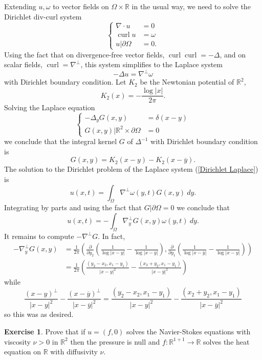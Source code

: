 \documentclass[10pt]{article}
\newcommand{\RR}{\mathbb{R}}
\DeclareMathOperator{\curl}{curl}
\theoremstyle{definition}
\newtheorem{exer}{Exercise}
\begin{document}
Extending $u, \omega$ to vector fields on $\Omega \times \RR$ in the usual way, we need to solve the Dirichlet div-curl system
$$\begin{cases}
\nabla \cdot u &= 0\\
\curl u &= \omega\\
u|\partial \Omega &= 0.
\end{cases}$$
Using the fact that on divergence-free vector fields, $\curl \curl = -\Delta$, and on scalar fields, $\curl = \nabla^\perp$, this system simplifies to the Laplace system
\begin{equation}
\label{Dirichlet Laplace}
-\Delta u = \nabla^\perp \omega
\end{equation}
with Dirichlet boundary condition.
Let $K_2$ be the Newtonian potential of $\RR^2$,
$$K_2(x) = -\frac{\log|x|}{2\pi}.$$
Solving the Laplace equation
$$
\begin{cases}-\Delta_y G(x, y) &= \delta(x - y)\\
G(x, y)|\RR^2 \times \partial \Omega &= 0
\end{cases}$$
we conclude that the integral kernel $G$ of $\Delta^{-1}$ with Dirichlet boundary condition is
$$G(x, y) = K_2(x - y) - K_2(x - \overline y).$$
The solution to the Dirichlet problem of the Laplace system (\ref{Dirichlet Laplace}) is
$$u(x, t) = \int_\Omega \nabla^\perp \omega(y, t) G(x, y) ~dy.$$
Integrating by parts and using the fact that $G|\partial \Omega = 0$ we conclude that
$$u(x, t) = -\int_\Omega \nabla^\perp_y G(x, y) \omega(y, t) ~dy.$$
It remains to compute $-\nabla^\perp G$. In fact,
\begin{align*}-\nabla^\perp_y G(x, y) &=
\frac{1}{2\pi} \left(\frac{\partial}{\partial y_2} \left(\frac{1}{\log|x - y|} - \frac{1}{\log|x - \overline y|}\right), \frac{\partial}{\partial y_1} \left(\frac{1}{\log|x - \overline y|} - \frac{1}{\log|x - y|}\right) \right)\\
&= \frac{1}{2\pi} \left(\frac{(y_2 - x_2, x_1 - y_1)}{|x - y|^2} - \frac{(x_2 + y_2, x_1 - y_1)}{|x - \overline y|^2}\right)
\end{align*}
while
$$\frac{(x - y)^\perp}{|x - y|^2} - \frac{(x - \overline y)^\perp}{|x - \overline y|^2} = \frac{(y_2 - x_2, x_1 - y_1)}{|x - y|^2} - \frac{(x_2 + y_2, x_1 - y_1)}{|x - \overline y|^2}$$
so this was as desired.

\begin{exer}
Prove that if $u = (f, 0)$ solves the Navier-Stokes equations with viscosity $\nu > 0$ in $\RR^2$ then the pressure is null and $f: \RR^{1 + 1} \to \RR$ solves the heat equation on $\RR$ with diffusivity $\nu$.
\end{exer}
\end{document}
